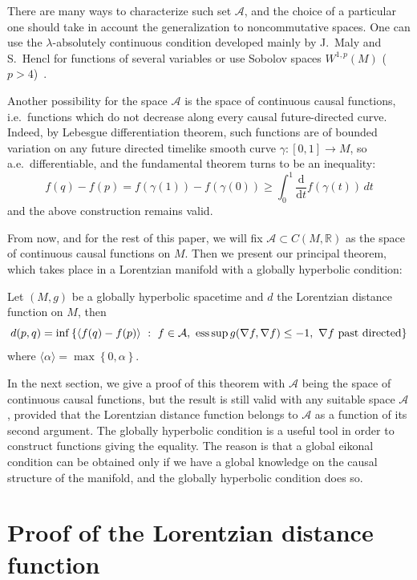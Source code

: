 \documentclass[pdftex]{sigma}
\newcommand{\set}[1]{\left\{ {#1} \right\}}
\newcommand{\dv}[2]{\frac{\mathrm d{#1}}{\mathrm d{#2}}}
\newcommand{\setR}{{\mathbb R}}
\begin{document}
There are many ways to characterize such set $\mathcal A$, and the choice of a particular one should take in account the generalization to noncommutative spaces. One can use the $\lambda$-absolutely continuous condition developed mainly by J.~Maly and S.~Hencl for functions of several variables or use Sobolov spaces $W^{1,p}(M)$ ($p>4$)~\cite{Hen,Mal}.

Another possibility for the space $\mathcal A$ is the space of continuous causal functions, i.e.\ functions which do not decrease along every causal future-directed curve. Indeed, by Lebesgue dif\/ferentiation theorem, such functions are of bounded variation on any future directed timelike smooth curve $\gamma : [0,1] \rightarrow M$, so a.e.\ dif\/ferentiable, and the fundamental theorem turns to be an inequality:
\[
f(q) - f(p) = f(\gamma(1)) - f(\gamma(0)) \geq \int_0^1 \dv{}{t} f(\gamma(t)) \, dt
\]
and the above construction remains valid.

From now, and for the rest of this paper, we will f\/ix $\mathcal A \subset C(M,\setR)$ as the space of continuous causal functions on $M$. Then we present our principal theorem, which takes place in a Lorentzian manifold with a globally hyperbolic condition:

\begin{theorem}\label{mainth}
Let $(M,g)$ be a globally hyperbolic spacetime and $d$ the Lorentzian distance function on $M$, then
\[
d(p,q) = \inf\set{ \langle f(q)-f(p) \rangle \ :\  f \in \mathcal A,\  \text{\rm ess} \sup g( \nabla f, \nabla f ) \leq -1, \ \nabla f \text{ past directed}}
\]
where $\langle \alpha \rangle = \max\set{0,\alpha}$.

\end{theorem}

In the next section, we give a proof of this theorem with $\mathcal A$ being the space of continuous causal functions, but the result is still valid with any suitable space $\mathcal A$, provided that the Lorentzian distance function belongs to $\mathcal A$ as a function of its second argument. The globally hyperbolic condition is a useful tool in order to construct functions giving the equality. The reason is that a global eikonal condition can be obtained only if we have a global knowledge on the causal structure of the manifold, and the globally hyperbolic condition does so.


\section{Proof of the Lorentzian distance function}
\end{document}
